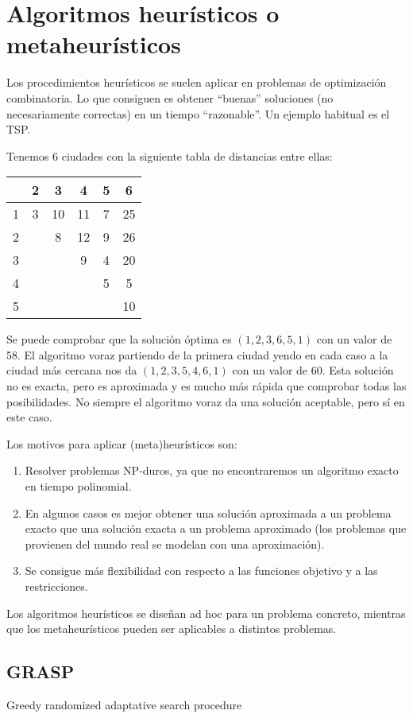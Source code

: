 \documentclass[AL.tex]{subfiles}
\begin{document}
\chapter{Algoritmos heurísticos o metaheurísticos}
Los procedimientos heurísticos se suelen aplicar en problemas de optimización combinatoria. Lo que consiguen es obtener ``buenas'' soluciones (no necesariamente correctas) en un tiempo ``razonable''. Un ejemplo habitual es el TSP.


\begin{ej}
Tenemos 6 ciudades con la siguiente tabla de distancias entre ellas:

\begin{tabular}{c|c c c c c|}
  & 2 & 3  & 4  & 5 & 6\\
 \hline
1 & 3 & 10 & 11 & 7 & 25\\
2 &   &  8 & 12 & 9 & 26\\
3 &   &    &  9 & 4 & 20\\
4 &   &    &    & 5 & 5\\
5 & & & & &  10
\end{tabular}

Se puede comprobar que la solución óptima es $(1,2,3,6,5,1)$ con un valor de 58. El algoritmo voraz partiendo de la primera ciudad yendo en cada caso a la ciudad más cercana nos da $(1,2,3,5,4,6,1)$ con un valor de 60. Esta solución no es exacta, pero es aproximada y es mucho más rápida que comprobar todas las posibilidades. No siempre el algoritmo voraz da una solución aceptable, pero sí en este caso.
\end{ej}

Los motivos para aplicar (meta)heurísticos son:
\begin{enumerate}
\item Resolver problemas NP-duros, ya que no encontraremos un algoritmo exacto en tiempo polinomial.
\item En algunos casos es mejor obtener una solución aproximada a un problema exacto que una solución exacta a un problema aproximado (los problemas que provienen del mundo real se modelan con una aproximación).
\item Se consigue más flexibilidad con respecto a las funciones objetivo y a las restricciones.
\end{enumerate}

Los algoritmos heurísticos se diseñan ad hoc para un problema concreto, mientras que los metaheurísticos pueden ser aplicables a distintos problemas.


\section{GRASP}
Greedy randomized adaptative search procedure
\end{document}
